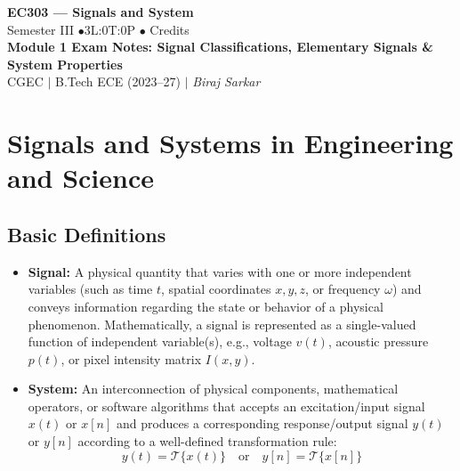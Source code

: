 \documentclass[12pt,a4paper]{article}
\begin{document}
\begin{center}
  {\LARGE\bfseries\color{myred} EC303 --- Signals and System}\\[5pt]
  {\normalsize\color{mydark} Semester III \quad$\bullet$\quad 3L:0T:0P \quad$\bullet$ Credits}\\[3pt]
  {\normalsize\color{myteal}\textbf{Module 1 Exam Notes: Signal Classifications, Elementary Signals \& System Properties}}\\[3pt]
  {\small\color{mydark} CGEC \;$|$\; B.Tech ECE (2023--27) \;$|$\; \textit{Biraj Sarkar}}
\end{center}
\vspace{2pt}
\noindent{\color{myred}\rule{\linewidth}{1.5pt}}
\vspace{2pt}

\hypersetup{linkcolor=mydark}
\tableofcontents
\hypersetup{linkcolor=myteal}
\newpage

\section{Signals and Systems in Engineering and Science}

\subsection{Basic Definitions}
\begin{tcolorbox}[defbox, title={\textbf{Definition: Signal and System}}]
\begin{itemize}[leftmargin=*, itemsep=4pt]
  \item \textbf{Signal:} A physical quantity that varies with one or more independent variables (such as time $t$, spatial coordinates $x, y, z$, or frequency $\omega$) and conveys information regarding the state or behavior of a physical phenomenon. Mathematically, a signal is represented as a single-valued function of independent variable(s), e.g., voltage $v(t)$, acoustic pressure $p(t)$, or pixel intensity matrix $I(x,y)$.
  \item \textbf{System:} An interconnection of physical components, mathematical operators, or software algorithms that accepts an excitation/input signal $x(t)$ or $x[n]$ and produces a corresponding response/output signal $y(t)$ or $y[n]$ according to a well-defined transformation rule:
  \begin{equation}
    y(t) = \mathcal{T}\{x(t)\} \quad \text{or} \quad y[n] = \mathcal{T}\{x[n]\}
  \end{equation}
\end{itemize}
\end{tcolorbox}
\end{document}
